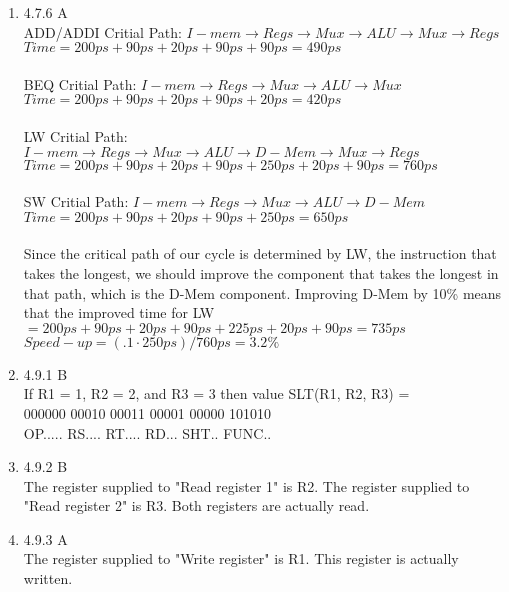 \documentclass[12pt]{article}
\begin{document}
\begin{enumerate}
\item 4.7.6 A \\
ADD/ADDI Critial Path: $I-mem\rightarrow Regs\rightarrow Mux \rightarrow ALU \rightarrow Mux \rightarrow Regs$ \\
$Time = 200ps+90ps+20ps+90ps+90ps=490ps$ \\
\\
BEQ Critial Path: $I-mem\rightarrow Regs\rightarrow Mux \rightarrow ALU \rightarrow Mux$ \\
$Time = 200ps+90ps+20ps+90ps+20ps=420ps$ \\
\\
LW Critial Path: $I-mem\rightarrow Regs\rightarrow Mux \rightarrow ALU \rightarrow D-Mem \rightarrow Mux \rightarrow Regs$ \\
$Time = 200ps+90ps+20ps+90ps+250ps+20ps+90ps=760ps$ \\
\\
SW Critial Path: $I-mem\rightarrow Regs\rightarrow Mux \rightarrow ALU \rightarrow D-Mem$ \\
$Time = 200ps+90ps+20ps+90ps+250ps=650ps$ \\
\\
Since the critical path of our cycle is determined by LW, the instruction that takes the longest, we should improve the component that takes the longest in that path, which is the D-Mem component. Improving D-Mem by 10\% means that the improved time for LW $= 200ps+90ps+20ps+90ps+225ps+20ps+90ps=735ps$\\
$Speed-up = (.1 \cdot 250ps)/760ps = 3.2\%$
\\

\item 4.9.1 B \\
If R1 = 1, R2 = 2, and R3 = 3 then value SLT(R1, R2, R3) = \\
000000 00010 00011 00001 00000 101010 \\
OP..... RS.... RT.... RD... SHT.. FUNC.. 
\\

\item 4.9.2 B \\
The register supplied to "Read register 1" is R2. The register supplied to "Read register 2" is R3. Both registers are actually read.
\\

\item 4.9.3 A \\
The register supplied to "Write register" is R1. This register is actually written.
\\


\end{enumerate}
\end{document}
